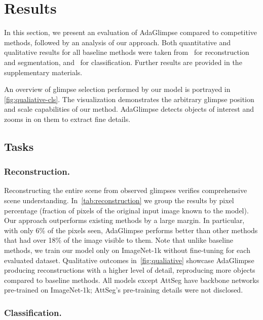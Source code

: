 \documentclass[runningheads]{llncs}
\newcommand{\ours}[0]{AdaGlimpse}
\begin{document}
\section{Results}







In this section, we present an evaluation of \ours{} compared to competitive methods, followed by an analysis of our approach. Both quantitative and qualitative results for all baseline methods were taken from~\cite{pardyl2023active} for reconstruction and segmentation, and~\cite{rangrej2022consistency} for classification. Further results are provided in the supplementary materials.


An overview of glimpse selection performed by our model is portrayed in \cref{fig:qualiative-cls}. The visualization demonstrates the arbitrary glimpse position and scale capabilities of our method. \ours{} detects objects of interest and zooms in on them to extract fine details. 


\subsection{Tasks}

\subsubsection{Reconstruction.}


Reconstructing the entire scene from observed glimpses verifies comprehensive scene understanding. In~\cref{tab:reconstruction} we group the results by pixel percentage (fraction of pixels of the original input image known to the model). Our approach outperforms existing methods by a large margin. In particular, with only 6\% of the pixels seen, \ours{} performs better than other methods that had over 18\% of the image visible to them. Note that unlike baseline methods, we train our model only on ImageNet-1k without fine-tuning for each evaluated dataset. Qualitative outcomes in~\cref{fig:qualiative} showcase \ours{} producing reconstructions with a higher level of detail, reproducing more objects compared to baseline methods. All models except AttSeg have backbone networks pre-trained on ImageNet-1k; AttSeg's pre-training details were not disclosed.

\subsubsection{Classification.}
\end{document}

